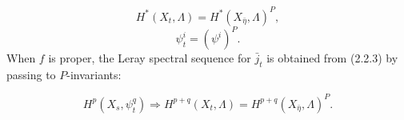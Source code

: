 \begin{equation}\tag{2.7.1}
H^*(X_t,\Lambda)=H^*(X_{\bar\eta},\Lambda)^P,
\end{equation}
\begin{equation}\tag{2.7.2}
\psi^i_t=(\psi^i)^P.
\end{equation}
When $f$ is proper, the Leray spectral sequence for $\bar j_t$ is obtained from (2.2.3) by passing to $P$-invariants:

\begin{equation}\tag{2.7.3}
H^p(X_s,\psi^q_t)\Longrightarrow H^{p+q}(X_t,\Lambda)
=H^{p+q}(X_{\bar\eta},\Lambda)^P.
\end{equation}
